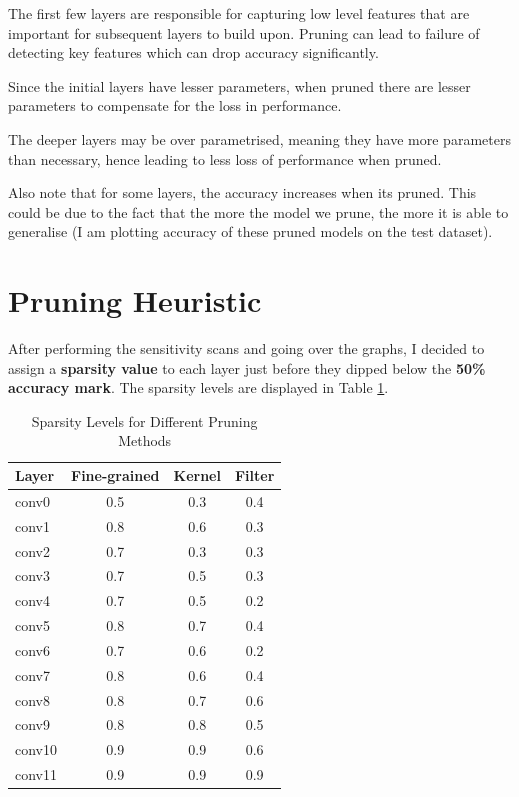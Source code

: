 \documentclass[12pt]{article}
\begin{document}
\noindent
The first few layers are responsible for capturing low level features that are important for subsequent layers to build upon. Pruning can lead to failure of detecting  key features which can drop accuracy significantly. 

Since the initial layers have lesser parameters, when pruned there are lesser parameters to compensate for the loss in performance.

The deeper layers may be over parametrised, meaning they have more parameters than necessary, hence leading to less loss of performance when pruned. 

Also note that for some layers, the accuracy increases when its pruned. This could be due to the fact that the more the model we prune, the more it is able to generalise (I am plotting accuracy of these pruned models on the test dataset). 

\section{Pruning Heuristic}
After performing the sensitivity scans and going over the graphs, I decided to assign a \textbf{sparsity value} to each layer just before they dipped below the \textbf{50\% accuracy mark}. The sparsity levels are displayed in Table \ref{tab:pruning_levels}.
\begin{table}[h]
\centering
\begin{tabular}{lccc}
\hline
\textbf{Layer} & \textbf{Fine-grained} & \textbf{Kernel} & \textbf{Filter} \\
\hline
conv0  & 0.5 & 0.3 & 0.4 \\
conv1  & 0.8 & 0.6 & 0.3 \\
conv2  & 0.7 & 0.3 & 0.3 \\
conv3  & 0.7 & 0.5 & 0.3 \\
conv4  & 0.7 & 0.5 & 0.2 \\
conv5  & 0.8 & 0.7 & 0.4 \\
conv6  & 0.7 & 0.6 & 0.2 \\
conv7  & 0.8 & 0.6 & 0.4 \\
conv8  & 0.8 & 0.7 & 0.6 \\
conv9  & 0.8 & 0.8 & 0.5 \\
conv10 & 0.9 & 0.9 & 0.6 \\
conv11 & 0.9 & 0.9 & 0.9 \\
\hline
\end{tabular}
\caption{\label{tab:pruning_levels}Sparsity Levels for Different Pruning Methods}
\end{table}
\end{document}
